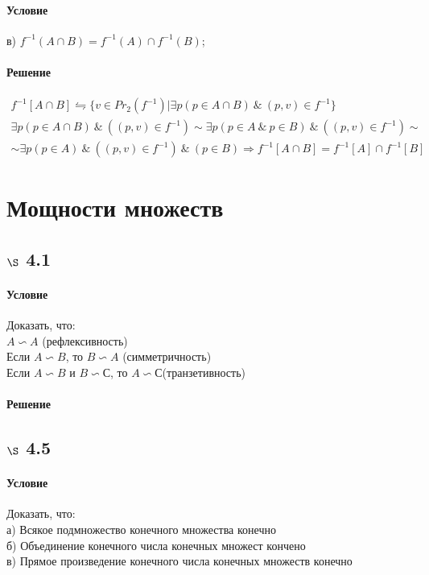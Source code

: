 \documentclass[a4paper,12pt]{article}
\begin{document}
\paragraph*{Условие}
в) $f^{-1} (A\cap B) = f^{-1} (A) \cap f^{-1} (B)$; \\
\paragraph*{Решение}
\begin{gather*}
f^{-1}[A\cap B] \leftrightharpoons \{v\in Pr_2(f^{-1})|\exists p(p\in A\cap B) \ \& \ (p,v) \in f^{-1}\}\\
\exists p(p\in A\cap B) \ \& \ ((p,v) \in f^{-1}) \sim \exists p(p\in A \ \& \ p\in B) \ \& \ ((p,v) \in f^{-1}) \sim \\
\sim \exists p(p\in A) \ \& \ ((p,v) \in f^{-1}) \ \& \ (p\in B)  \Rightarrow f^{-1}[A\cap B] = f^{-1}[A] \cap f^{-1}[B]
\end{gather*}

\section{Мощности множеств}
\subsection*{$\S$ 4.1}
\paragraph*{Условие}
Доказать, что:\\
$ A \backsim A $ (рефлексивность)\\
Если $ A \backsim B $, то $ B \backsim A $ (симметричность)\\
Если $ A \backsim B $ и $ B \backsim С $, то $ A \backsim С $(транзетивность)
\paragraph*{Решение}

\subsection*{$\S$ 4.5}
\paragraph*{Условие}
Доказать, что:\\
а) Всякое подмножество конечного множества конечно\\
б) Объединение конечного числа конечных множест кончено\\
в) Прямое произведение конечного числа конечных множеств конечно
\end{document}
